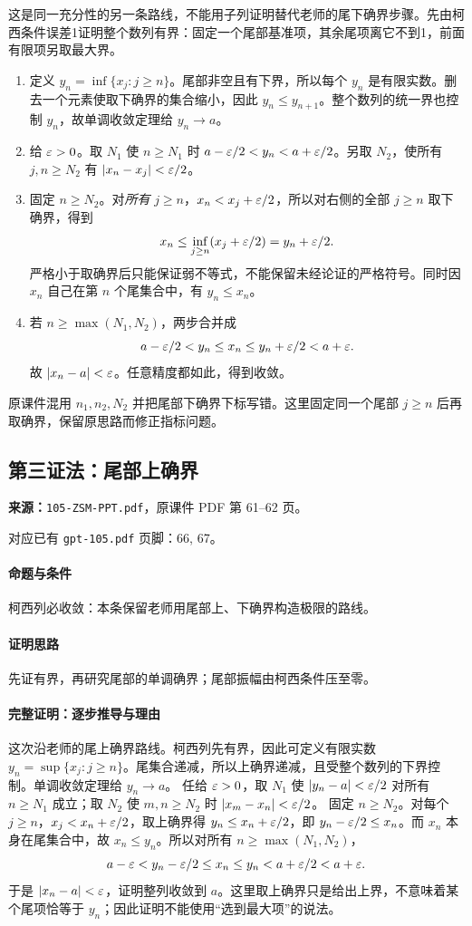 这是同一充分性的另一条路线，不能用子列证明替代老师的尾下确界步骤。先由柯西条件误差1证明整个数列有界：固定一个尾部基准项，其余尾项离它不到1，前面有限项另取最大界。
\begin{enumerate}
\item 定义 $y_n=\inf\{x_j:j\ge n\}$。尾部非空且有下界，所以每个 $y_n$ 是有限实数。删去一个元素使取下确界的集合缩小，因此 $y_n\le y_{n+1}$。整个数列的统一界也控制 $y_n$，故单调收敛定理给 $y_n\to a$。
\item 给 $\varepsilon>0$。取 $N_1$ 使 $n\ge N_1$ 时 $a-\varepsilon/2<y_n<a+\varepsilon/2$。另取 $N_2$，使所有 $j,n\ge N_2$ 有 $|x_n-x_j|<\varepsilon/2$。
\item 固定 $n\ge N_2$。对\emph{所有} $j\ge n$，$x_n<x_j+\varepsilon/2$，所以对右侧的全部 $j\ge n$ 取下确界，得到
\[x_n\le\inf_{j\ge n}(x_j+\varepsilon/2)=y_n+\varepsilon/2.\]
严格小于取确界后只能保证弱不等式，不能保留未经论证的严格符号。同时因 $x_n$ 自己在第 $n$ 个尾集合中，有 $y_n\le x_n$。
\item 若 $n\ge\max(N_1,N_2)$，两步合并成
\[a-\varepsilon/2<y_n\le x_n\le y_n+\varepsilon/2<a+\varepsilon.\]
故 $|x_n-a|<\varepsilon$。任意精度都如此，得到收敛。
\end{enumerate}
原课件混用 $n_1,n_2,N_2$ 并把尾部下确界下标写错。这里固定同一个尾部 $j\ge n$ 后再取确界，保留原思路而修正指标问题。

\clearpage\subsection{第三证法：尾部上确界}
\textbf{来源：}\texttt{105-ZSM-PPT.pdf}，原课件 PDF 第 61--62 页。\par
对应已有 \texttt{gpt-105.pdf} 页脚：66, 67。\par
\paragraph{命题与条件}柯西列必收敛：本条保留老师用尾部上、下确界构造极限的路线。
\paragraph{证明思路}先证有界，再研究尾部的单调确界；尾部振幅由柯西条件压至零。
\paragraph{完整证明：逐步推导与理由}

这次沿老师的尾上确界路线。柯西列先有界，因此可定义有限实数 $y_n=\sup\{x_j:j\ge n\}$。尾集合递减，所以上确界递减，且受整个数列的下界控制。单调收敛定理给 $y_n\to a$。
任给 $\varepsilon>0$，取 $N_1$ 使 $|y_n-a|<\varepsilon/2$ 对所有 $n\ge N_1$ 成立；取 $N_2$ 使 $m,n\ge N_2$ 时 $|x_m-x_n|<\varepsilon/2$。
固定 $n\ge N_2$。对每个 $j\ge n$，$x_j<x_n+\varepsilon/2$，取上确界得 $y_n\le x_n+\varepsilon/2$，即 $y_n-\varepsilon/2\le x_n$。而 $x_n$ 本身在尾集合中，故 $x_n\le y_n$。所以对所有 $n\ge\max(N_1,N_2)$，
\[a-\varepsilon<y_n-\varepsilon/2\le x_n\le y_n<a+\varepsilon/2<a+\varepsilon.\]
于是 $|x_n-a|<\varepsilon$，证明整列收敛到 $a$。这里取上确界只是给出上界，不意味着某个尾项恰等于 $y_n$；因此证明不能使用“选到最大项”的说法。

